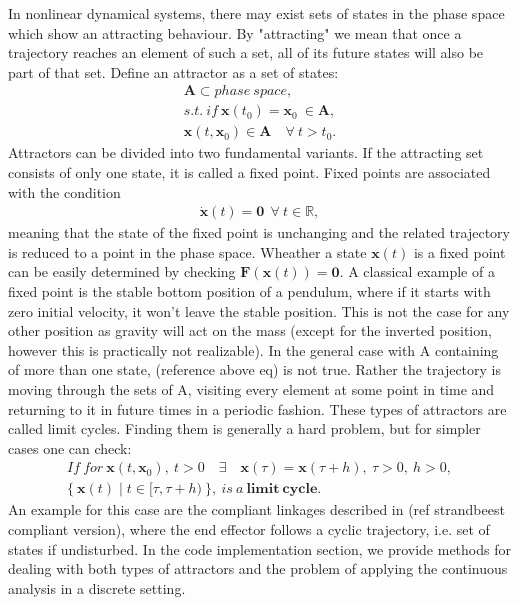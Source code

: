     In nonlinear dynamical systems, there may exist sets of states in the phase space which show an attracting behaviour. By "attracting" we mean that once a trajectory reaches an element of such a set, all of its future states will also be part of that set. Define an attractor as a set of states:
    \begin{gather} \mathbf{A} \subset phase\ space,\\ s.t.\ if \ \mathbf{x}(t_0) = \mathbf{x}_0\ \in \mathbf{A}, \\ \mathbf{x}(t,\mathbf{x}_0) \in \mathbf{A}\quad \forall\ t > t_0. \label{eq:2} \end{gather}
    Attractors can be divided into two fundamental variants.
    If the attracting set consists of only one state, it is called a fixed point. Fixed points are associated with the condition
    \begin{gather} \label{eq:3} \dot{\mathbf{x}}(t) = \mathbf{0}\ \ \forall \ t \in \mathbb{R},\end{gather}
    meaning that the state of the fixed point is unchanging and the related trajectory is reduced to a point in the phase space. Wheather a state $\mathbf{x}(t)$ is a fixed point can be easily determined by checking $\mathbf{F}(\mathbf{x}(t)) = \mathbf{0}$. A classical example of a fixed point is the stable bottom position of a pendulum, where if it starts with zero initial velocity, it won't leave the stable position. This is not the case for any other position as gravity will act on the mass (except for the inverted position, however this is practically not realizable).
    In the general case with A containing of more than one state, (reference above eq) is not true. Rather the trajectory is moving through the sets of A, visiting every element at some point in time and returning to it in future times in a periodic fashion. These types of attractors are called limit cycles. Finding them is generally a hard problem, but for simpler cases one can check:
    \begin{gather} If\ for \ \mathbf{x}(t,\mathbf{x}_0) ,\ t > 0 \quad \exists \quad \mathbf{x}(\tau) = \mathbf{x}(\tau + h),\ \tau > 0,\ h > 0, \\ \{\ \mathbf{x}(t) \mid t \in [\tau,\tau + h)\ \}, \ is \ a\ \mathbf{limit\ cycle}. \end{gather}
    An example for this case are the compliant linkages described in (ref strandbeest compliant version), where the end effector follows a cyclic trajectory, i.e. set of states if undisturbed. 
    In the code implementation section, we provide methods for dealing with both types of attractors and the problem of applying the continuous analysis in a discrete setting. 

